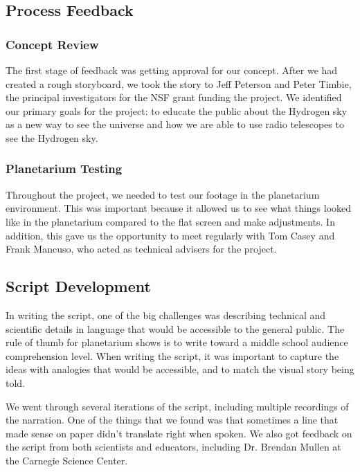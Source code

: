 \subsection{Process Feedback}

\subsubsection{Concept Review}

The first stage of feedback was getting approval for our concept. After we had created a rough storyboard, we took the story to Jeff Peterson and Peter Timbie, the principal investigators for the NSF grant funding the project. We identified our primary goals for the project: to educate the public about the Hydrogen sky as a new way to see the universe and how we are able to use radio telescopes to see the Hydrogen sky. 

\subsubsection{Planetarium Testing}

Throughout the project, we needed to test our footage in the planetarium environment. This was important because it allowed us to see what things looked like in the planetarium compared to the flat screen and make adjustments. In addition, this gave us the opportunity to meet regularly with Tom Casey and Frank Mancuso, who acted as technical advisers for the project. 


\subsection{Script Development}

In writing the script, one of the big challenges was describing technical and scientific details in language that would be accessible to the general public. The rule of thumb for planetarium shows is to write toward a middle school audience comprehension level. When writing the script, it was important to capture the ideas with analogies that would be accessible, and to match the visual story being told. 

We went through several iterations of the script, including multiple recordings of the narration. One of the things that we found was that sometimes a line that made sense on paper didn't translate right when spoken. We also got feedback on the script from both scientists and educators, including Dr. Brendan Mullen at the Carnegie Science Center. 

